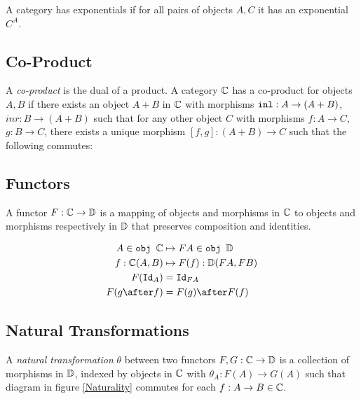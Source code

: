 \documentclass{Report}
\begin{document}

A category has exponentials if for all pairs of objects $A, C$ it has an exponential $C^A$.

\subsection{Co-Product}
A \textit{co-product} is the dual of a product. A category $\mathbb{C}$ has a co-product for objects $A, B$ if there exists an object $A+B$ in $\mathbb{C}$ with morphisms $\texttt{inl}: A\rightarrow (A+B)$, $inr: B\rightarrow (A+B)$ such that for any other object $C$ with morphisms $f: A\rightarrow C$, $g: B\rightarrow C$, there exists a unique morphism $[f, g]: (A + B)\rightarrow C $ such that the following commutes:





\subsection{Functors}
A functor $F: \mathbb{C} \rightarrow \mathbb{D}$ is a mapping of objects and morphisms in $\mathbb{C}$ to objects and morphisms respectively in $\mathbb{D}$ that preserves composition and identities.

\begin{align}
    A\in\obj\C &\mapsto FA \in \obj\DC\\
    f: \C(A, B) &\mapsto F(f): \DC(FA, FB)\\
    F(\Id{A}) & = \Id{FA} \\
    F(g\after f) & = F(g)\after F(f)
\end{align}

\subsection{Natural Transformations}

A \textit{natural transformation} $\theta$ between two functors $F, G: \mathbb{C} \rightarrow \mathbb{D}$ is a collection of morphisms in $\mathbb{D}$, indexed by objects in $\mathbb{C}$ with  $\theta_A: F(A) \rightarrow G(A)$ such that diagram in figure \ref{Naturality} commutes for each $f: A \rightarrow B \in \mathbb{C}$.
\end{document}

